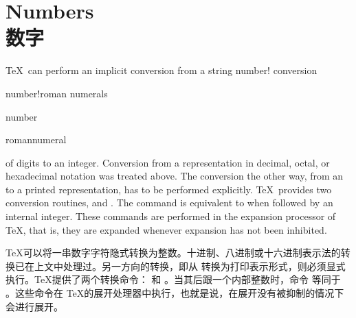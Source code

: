 \documentclass[twoside,letterpaper]{rapport3}
\begin{document}


\setcounter{chapter}{6} %



\section{Numbers\\数字}

\TeX\ can perform an implicit conversion from a string
\term number! conversion\par\term number!roman numerals\par
\cstoidx number\par\cstoidx romannumeral\par
of digits to an integer. Conversion from a representation
in decimal, octal, or hexadecimal notation was
 treated above. The conversion the other way,
from an  to a printed representation,
has to be performed explicitly.
\TeX\ provides two conversion routines,
 and .
The command  is equivalent to 
when followed by an internal integer.
These commands are performed in the expansion processor of \TeX, that is,
they are expanded whenever expansion has not been inhibited.

\TeX 可以将一串数字字符隐式转换为整数。十进制、八进制或十六进制表示法的转换已在上文中处理过。另一方向的转换，即从  转换为打印表示形式，则必须显式执行。\TeX 提供了两个转换命令： 和 。当其后跟一个内部整数时，命令  等同于 。这些命令在 \TeX 的展开处理器中执行，也就是说，在展开没有被抑制的情况下会进行展开。
\end{document}
